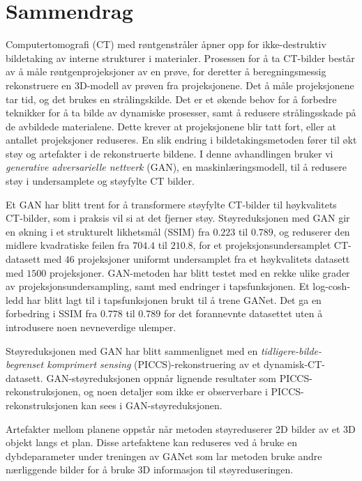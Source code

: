 \chapter*{Sammendrag}
Computertomografi (CT) med røntgenstråler åpner opp for ikke-destruktiv bildetaking av interne strukturer i materialer. Prosessen for å ta CT-bilder består av å måle røntgenprojeksjoner av en prøve, for deretter å beregningsmessig rekonstruere en 3D-modell av prøven fra projeksjonene. Det å måle projeksjonene tar tid, og det brukes en strålingskilde. Det er et økende behov for å forbedre teknikker for å ta bilde av dynamiske prosesser, samt å redusere strålingsskade på de avbildede materialene. Dette krever at projeksjonene blir tatt fort, eller at antallet projeksjoner reduseres. En slik endring i bildetakingsmetoden fører til økt støy og artefakter i de rekonstruerte bildene. I denne avhandlingen bruker vi \textit{generative adversarielle nettverk} (GAN), en maskinlæringsmodell, til å redusere støy i undersamplete og støyfylte CT bilder. 

Et GAN har blitt trent for å transformere støyfylte CT-bilder til høykvalitets CT-bilder, som i praksis vil si at det fjerner støy. Støyreduksjonen med GAN gir en økning i et strukturelt likhetsmål (SSIM) fra $0.223$ til $0.789$, og reduserer den midlere kvadratiske feilen fra $704.4$ til $210.8$, for et projeksjonsundersamplet CT-datasett med $46$ projeksjoner uniformt undersamplet fra et høykvalitets datasett med $1500$ projeksjoner. GAN-metoden har blitt testet med en rekke ulike grader av projeksjonsundersampling, samt med endringer i tapsfunksjonen. Et log-cosh-ledd har blitt lagt til i tapsfunksjonen brukt til å trene GANet. Det ga en forbedring i SSIM fra $0.778$ til $0.789$ for det forannevnte datasettet uten å introdusere noen nevneverdige ulemper. 

Støyreduksjonen med GAN har blitt sammenlignet med en \textit{tidligere-bilde-begrenset komprimert sensing} (PICCS)-rekonstruering av et dynamisk-CT-datasett. GAN-støyreduksjonen oppnår lignende resultater som PICCS-rekonstruksjonen, og noen detaljer som ikke er observerbare i PICCS-rekonstruksjonen kan sees i GAN-støyreduksjonen. 

Artefakter mellom planene oppstår når metoden støyreduserer 2D bilder av et 3D objekt langs et plan. Disse artefaktene kan reduseres ved å bruke en dybdeparameter under treningen av GANet som lar metoden bruke andre nærliggende bilder for å bruke 3D informasjon til støyreduseringen. 